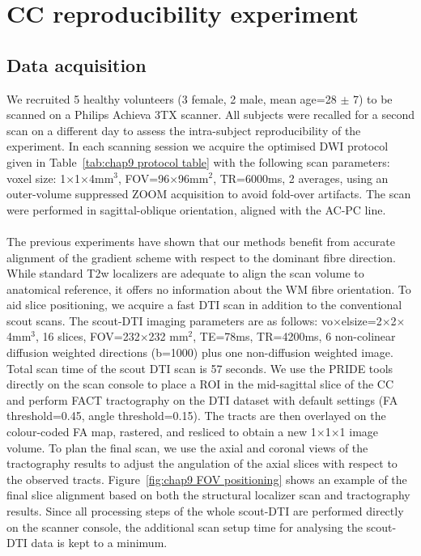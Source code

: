 \section{CC reproducibility experiment}
\subsection{Data acquisition}
We recruited 5 healthy volunteers (3 female, 2 male, mean age=28 $\pm$ 7) to be scanned on a Philips Achieva 3TX scanner. All subjects were recalled for a second scan on a different day to assess the intra-subject reproducibility of the experiment. In each scanning session we acquire the optimised DWI protocol given in Table~\ref{tab:chap9 protocol table} with the following scan parameters: voxel size: 1$\times$1$\times$4mm$^3$, FOV=96$\times$96mm$^2$, TR=6000ms, 2 averages, using an outer-volume suppressed ZOOM acquisition \citep{Wilm:2007} to avoid fold-over artifacts. The scan were performed in sagittal-oblique orientation, aligned with the AC-PC line.
\paragraph{}
The previous experiments have shown that our \SF{} methods benefit from accurate alignment of the gradient scheme with respect to the dominant fibre direction. While standard T2w localizers are adequate to align the scan volume to anatomical reference, it offers no information about the WM fibre orientation. To aid slice positioning, we acquire a fast DTI scan in addition to the conventional scout scans. The scout-DTI imaging parameters are as follows: vo$\times$elsize=2$\times$2$\times$4mm$^3$, 16 slices, FOV=232$\times$232 mm$^2$, TE=78ms, TR=4200ms, 6 non-colinear diffusion weighted directions (b=1000) plus one non-diffusion weighted image. Total scan time of the scout DTI scan is 57 seconds. We use the PRIDE tools directly on the scan console to place a \gls{ROI} in the mid-sagittal slice of the \gls{CC} and perform FACT tractography on the DTI dataset with default settings (FA threshold=0.45, angle threshold=0.15). The tracts are then overlayed on the colour-coded FA map, rastered, and resliced to obtain a new 1$\times$1$\times$1 image volume. To plan the final \SF{} scan, we use the axial and coronal views of the tractography results to adjust the angulation of the axial slices with respect to the observed tracts.  Figure~\ref{fig:chap9 FOV positioning} shows an example of the final slice alignment based on both the structural localizer scan and tractography results. Since all processing steps of the whole scout-DTI are performed directly on the scanner console, the additional scan setup time for analysing the scout-DTI data is kept to a minimum.

